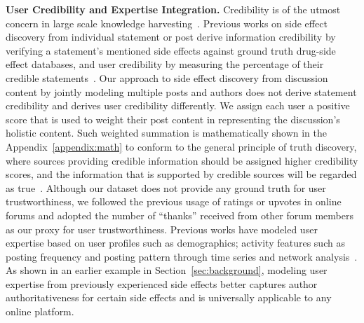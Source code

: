 \documentclass{bmcart}
\begin{document}
{\bf User Credibility and Expertise Integration.}
Credibility is of the utmost concern in large scale knowledge harvesting~\cite{hajli2015credibility,mukherjee2015leveraging,popat2016credibility}. Previous works on side effect discovery from individual statement or post derive information credibility by verifying a statement's mentioned side effects against ground truth drug-side effect databases, and user credibility by measuring the percentage of their credible statements~\cite{mukherjee2014people,li2017reliable}. Our approach to side effect discovery from discussion content 
by jointly modeling
multiple posts and authors does not derive statement credibility and derives user credibility differently. We assign each user a positive score that is used to weight their post content in representing the discussion's holistic content.
Such weighted summation is mathematically shown in the Appendix~\ref{appendix:math} to conform to the general principle of truth discovery, 
where sources providing credible information should be assigned higher credibility scores, and the information that is supported by credible sources will be
regarded as true~\cite{li2016survey}. Although our dataset does not provide any ground truth for user trustworthiness, we followed the previous usage of ratings or upvotes in online forums and adopted the number of ``thanks'' received from other forum members~\cite{rains2009health} as our proxy for user trustworthiness. Previous works have modeled user expertise based on user profiles such as demographics; activity features such as posting frequency and posting pattern through time series and network analysis~\cite{mukherjee2014people, vydiswaran2019identifying}. As shown in an earlier example in Section~\ref{sec:background}, modeling user expertise from previously experienced side effects better captures author authoritativeness for certain side effects and is universally applicable to any online platform. \\
\end{document}
